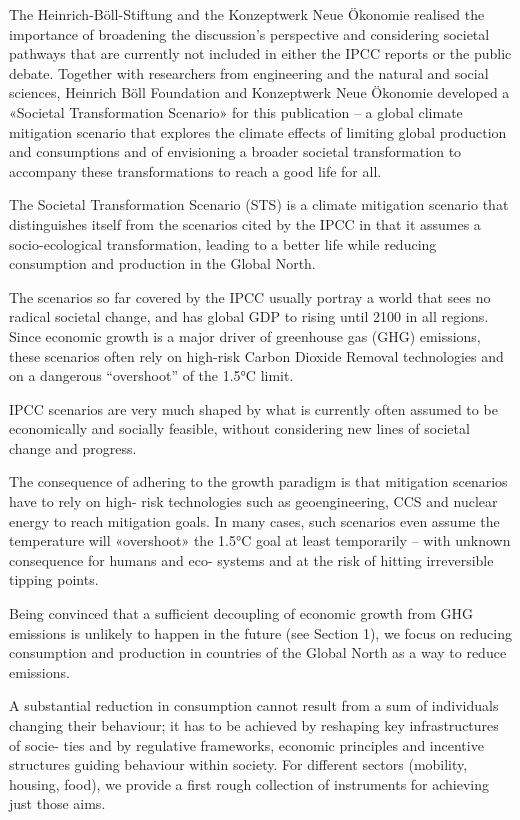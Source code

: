 \documentclass[
]{book}
\begin{document}
The Heinrich-Böll-Stiftung and the Konzeptwerk Neue Ökonomie realised the importance of broadening the discussion's perspective and considering societal pathways that are currently not included in either the IPCC reports or the public debate. Together with researchers from engineering and the natural and social sciences, Heinrich Böll Foundation and Konzeptwerk Neue Ökonomie developed a «Societal Transformation Scenario» for this publication -- a global climate mitigation scenario that explores the climate effects of limiting global production and consumptions and of envisioning a broader societal transformation to accompany these transformations to reach a good life for all.

The Societal Transformation Scenario (STS) is a climate mitigation scenario that distinguishes itself from the scenarios cited by the IPCC in that it assumes a socio-ecological transformation, leading to a better life while reducing consumption and production in the Global North.

The scenarios so far covered by the IPCC usually portray a world that sees no radical societal change, and has global GDP to rising until 2100 in all regions. Since economic growth is a major driver of greenhouse gas (GHG) emissions, these scenarios often rely on high-risk Carbon Dioxide Removal technologies and on a dangerous ``overshoot'' of the 1.5°C limit.

IPCC scenarios are very much shaped by what is currently often
assumed to be economically and socially feasible, without considering new lines of
societal change and progress.

The consequence
of adhering to the growth paradigm is that mitigation scenarios have to rely on high-
risk technologies such as geoengineering, CCS and nuclear energy to reach mitigation
goals. In many cases, such scenarios even assume the temperature will «overshoot»
the 1.5°C goal at least temporarily -- with unknown consequence for humans and eco-
systems and at the risk of hitting irreversible tipping points.

Being convinced that a sufficient decoupling of economic growth from GHG
emissions is unlikely to happen in the future (see Section 1), we focus on reducing
consumption and production in countries of the Global North as a way to reduce
emissions.

A substantial
reduction in consumption cannot result from a sum of individuals changing
their behaviour; it has to be achieved by reshaping key infrastructures of socie-
ties and by regulative frameworks, economic principles and incentive structures
guiding behaviour within society. For different sectors (mobility, housing, food),
we provide a first rough collection of instruments for achieving just those aims.
\end{document}
